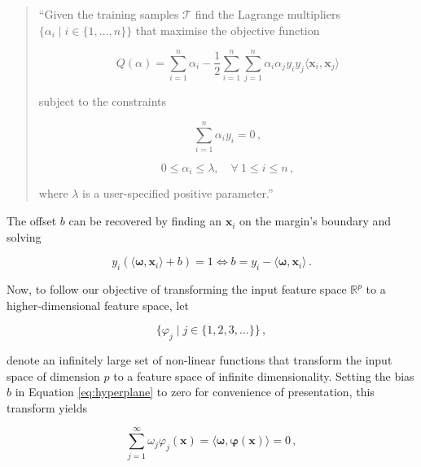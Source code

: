 \begin{quote}

``Given the training samples $\mathcal{T}$ find the Lagrange multipliers $\{\alpha_i \mid i \in \{1, \dots, n\}\}$ that maximise the objective function

\begin{equation}
Q(\alpha) =  \sum_{i=1}^n \alpha_i - \frac{1}{2} \sum_{i=1}^n\sum_{j=1}^n \alpha_i \alpha_j y_i y_j \langle \bm{x}_i , \bm{x}_j \rangle
\end{equation}

\noindent
subject to the constraints

\begin{equation}
\sum_{i=1}^n \alpha_i y_i = 0\,,
\end{equation}

\begin{equation}
 0 \leq \alpha_i \leq \lambda, \quad \forall \ 1 \leq i \leq n\,,
\end{equation}

\noindent
where $\lambda$ is a user-specified positive parameter.''

\end{quote}

\noindent
The offset $b$ can be recovered by finding an $\bm{x}_i$ on the margin's boundary and solving

\begin{equation}
y_i (\langle \bm{\omega} , \bm{x}_i \rangle + b) = 1 \Leftrightarrow b = y_i - \langle \bm{\omega} , \bm{x}_i \rangle\,.
\end{equation}

Now, to follow our objective of transforming the input feature space $\mathbb{R}^{p}$ to a higher-dimensional feature space, let 

 \begin{equation}
\big\{\varphi_j \mid j \in \{1, 2, 3, \dots \}\big\}\,, 
\end{equation}

\noindent
denote an infinitely large set of non-linear functions that transform the input space of dimension $p$ to a feature space of infinite dimensionality. Setting the bias $b$ in Equation \ref{eq:hyperplane} to zero for convenience of presentation, this transform yields

\begin{equation}
\sum_{j = 1}^{\infty} \omega_j \varphi_j(\bm{x}) = \langle \bm{\omega} , \bm{\varphi}(\bm{x}) \rangle = 0\,,
\label{eq:constrained_transformed}
\end{equation}

